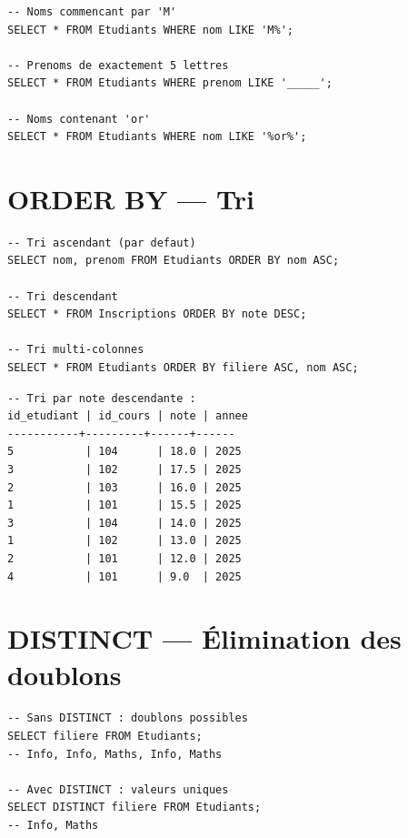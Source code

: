 \begin{codeblock}[title=\textbf{Exemples avec LIKE}]
\begin{verbatim}
-- Noms commencant par 'M'
SELECT * FROM Etudiants WHERE nom LIKE 'M%';

-- Prenoms de exactement 5 lettres
SELECT * FROM Etudiants WHERE prenom LIKE '_____';

-- Noms contenant 'or'
SELECT * FROM Etudiants WHERE nom LIKE '%or%';
\end{verbatim}
\end{codeblock}

\section{ORDER BY --- Tri}

\begin{codeblock}[title=\textbf{Tri des r\'esultats}]
\begin{verbatim}
-- Tri ascendant (par defaut)
SELECT nom, prenom FROM Etudiants ORDER BY nom ASC;

-- Tri descendant
SELECT * FROM Inscriptions ORDER BY note DESC;

-- Tri multi-colonnes
SELECT * FROM Etudiants ORDER BY filiere ASC, nom ASC;
\end{verbatim}
\end{codeblock}

\begin{codeoutput}
\begin{verbatim}
-- Tri par note descendante :
id_etudiant | id_cours | note | annee
-----------+---------+------+------
5           | 104      | 18.0 | 2025
3           | 102      | 17.5 | 2025
2           | 103      | 16.0 | 2025
1           | 101      | 15.5 | 2025
3           | 104      | 14.0 | 2025
1           | 102      | 13.0 | 2025
2           | 101      | 12.0 | 2025
4           | 101      | 9.0  | 2025
\end{verbatim}
\end{codeoutput}

\section{DISTINCT --- \'Elimination des doublons}

\begin{codeblock}[title=\textbf{Utilisation de DISTINCT}]
\begin{verbatim}
-- Sans DISTINCT : doublons possibles
SELECT filiere FROM Etudiants;
-- Info, Info, Maths, Info, Maths

-- Avec DISTINCT : valeurs uniques
SELECT DISTINCT filiere FROM Etudiants;
-- Info, Maths
\end{verbatim}
\end{codeblock}

